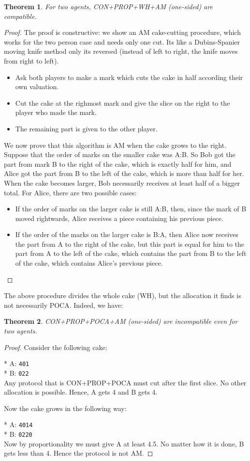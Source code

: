 \documentclass[a4paper,12pt]{article}
\newcommand{\biexample}[2]{
* \hspace{1cm}   A: \texttt{#1} \\
* \hspace{1cm}   B: \texttt{#2} \\
}
\newtheorem{thm}{Theorem}[section]
\begin{document}
\begin{thm}
For two agents, CON+PROP+WH+AM (one-sided) are compatible.
\end{thm}
\begin{proof}
The proof is constructive: we show an AM cake-cutting procedure, which works for the two person case and needs only one cut. Its like a Dubins-Spanier moving knife method only its reversed (instead of left to right, the knife moves from right to left).
\begin{itemize}
\item{Ask both players to make a mark which cuts the cake in half according their own valuation.}
\item{Cut the cake at the righmost mark and give the slice on the right to the player who made the mark.}
\item{The remaining part is given to the other player.}
\end{itemize}


We now prove that this algorithm is AM when the cake grows to the right. Suppose that the order of marks on the smaller cake was A:B. So Bob got the part from mark B to the right of the cake, which is exactly half for him, and Alice got the part from B to the left of the cake, which is more than half for her. When the cake becomes larger, Bob necessarily receives at least half of a bigger total. For Alice, there are two possible cases:
\begin{itemize}
\item{If the order of marks on the larger cake is still A:B, then, since the mark of B moved rightwards, Alice receives a piece containing his previous piece.}
\item{If the order of the marks on the larger cake is B:A, then Alice now receives the part from A to the right of the cake, but this part is equal for him to the part from A to the left of the cake, which contains the part from B to the left of the cake, which contains Alice's previous piece.}
\end{itemize}
\end{proof}

The above procedure divides the whole cake (WH), but the allocation it finds is not necessarily POCA. Indeed, we have:

\begin{thm}
CON+PROP+POCA+AM (one-sided) are incompatible even for two agents.
\end{thm}
\begin{proof}
Consider the following cake:

\biexample{401}{022}

Any protocol that is CON+PROP+POCA must cut after the first slice. No other allocation is possible. Hence, A gets 4 and B gets 4.

Now the cake grows in the following way:

\biexample{4014}{0220}

Now by proportionality we must give A at least 4.5. No matter how it is done, B gets less than 4. Hence the protocol is not AM.
\end{proof}
\end{document}
